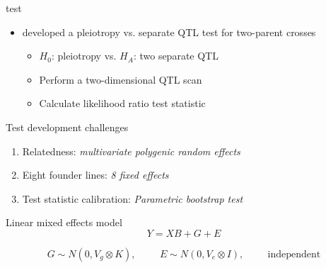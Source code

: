 \documentclass[final,hyperref={pdfpagelabels=false}]{beamer}
\begin{document}
\begin{frame}[t]
\begin{columns}[t]
\begin{column}{.465\textwidth} %



\begin{block}{\cite{jiang1995multiple} test}
\begin{itemize}
  \item \cite{jiang1995multiple} developed a pleiotropy vs. separate QTL test for two-parent crosses
  \begin{itemize}
    \item $H_0$: pleiotropy vs. $H_A$: two separate QTL
    \item Perform a two-dimensional QTL scan   
    \item Calculate likelihood ratio test statistic  
  \end{itemize}
\end{itemize}
\end{block}



\begin{block}{Test development challenges}

\begin{enumerate}
\item Relatedness: \emph{multivariate polygenic random effects}
\item Eight founder lines: \emph{8 fixed effects}
\item Test statistic calibration: \emph{Parametric bootstrap test}
\end{enumerate}

\end{block}

\begin{block}{Linear mixed effects model}
\begin{equation}
Y = XB + G + E
\end{equation}

\begin{equation}
G \sim N(0, V_g \otimes K), \hspace{1cm} E \sim N(0, V_e \otimes I), \hspace{1cm} \text{independent}
\end{equation}


\end{block}
\end{column}
\end{columns}
\end{frame}
\end{document}
